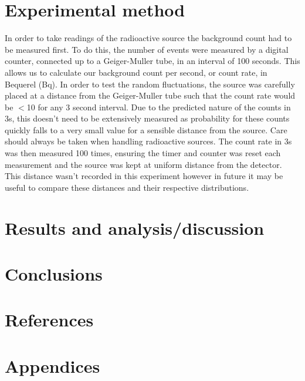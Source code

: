 \documentclass[11pt]{article}
\begin{document}
    \section{Experimental method}
    In order to take readings of the radioactive source the background count had to be measured first. To do this, the number of events were measured by a digital counter, connected  up to a Geiger-Muller tube, in an interval of 100 seconds. This allows us to calculate our background count per second, or count rate, in Bequerel (Bq). 
    \newline
    In order to test the random fluctuations, the  source was carefully placed at a distance from the Geiger-Muller tube such that the count rate would be $<$10 for any 3 second interval. Due to the predicted nature of the counts in 3s, this doesn't need to be extensively measured as probability for these counts quickly falls to a very small value for a sensible distance from the source. Care should always be taken when handling radioactive sources. 
    \newline
    The count rate in 3s was then measured 100 times, ensuring the timer and counter was reset each measurement and the source was kept at uniform distance from the detector. This distance wasn't recorded in this experiment however in future it may be useful to compare these distances and their respective distributions. 
    \section{Results and analysis/discussion}
    \section{Conclusions}
    \section{References}
    \section{Appendices}
    
     
\end{document}
